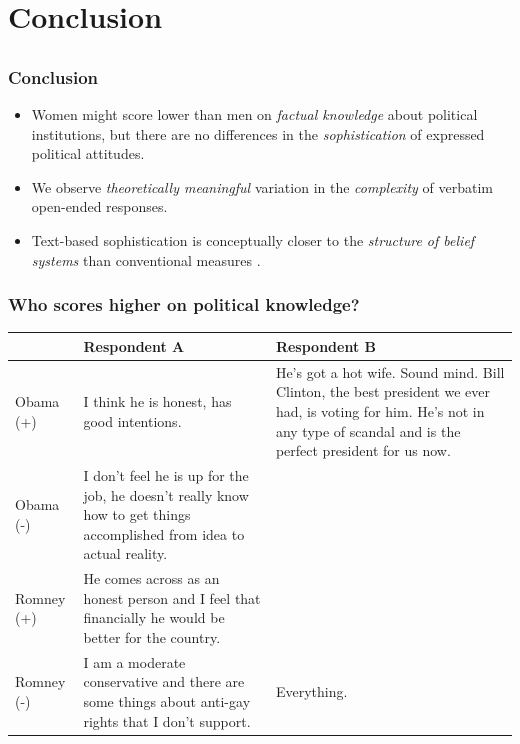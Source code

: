 \documentclass{beamer}
\begin{document}
\section{Conclusion}
\subsection{}
\begin{frame}%
  \frametitle{Conclusion}
  \begin{itemize}
\item Women might score lower than men on \emph{factual knowledge} about political institutions, but there are no differences in the \emph{sophistication} of expressed political attitudes.

\hspace{1em}
\item We observe \emph{theoretically meaningful} variation in the \emph{complexity} of verbatim open-ended responses.
\item Text-based sophistication is conceptually closer to the \emph{structure of belief systems} than conventional measures \citep[e.g.,][]{tetlock1983cognitive,luskin1987measuring}.
\end{itemize}
\end{frame}

\begin{frame}%
\frametitle{Who scores higher on political knowledge?}
\begin{table}[ht]\footnotesize\centering
\begin{tabular}{l|p{4.5cm}|p{4.5cm}}
   \toprule
    & \textbf{Respondent A} & \textbf{Respondent B} \\ 
    \midrule
  Obama (+) & I think he is honest, has good intentions. & He's got a hot wife. Sound mind. Bill Clinton, the best president we ever had, is voting for him. He's not in any type of scandal and is the perfect president for us now. \\ \hdashline
  Obama (-) & I don't feel he is up for the job, he doesn't really know how to get things accomplished from idea to actual reality. &  \\ \hdashline
  Romney (+) & He comes across as an honest person and I feel that financially he would be better for the country. &  \\ \hdashline
  Romney (-) & I am a moderate conservative and there are some things about anti-gay rights that I don't support. & Everything. \\
    \bottomrule
 \end{tabular}
\end{table}
\end{frame}
\end{document}
